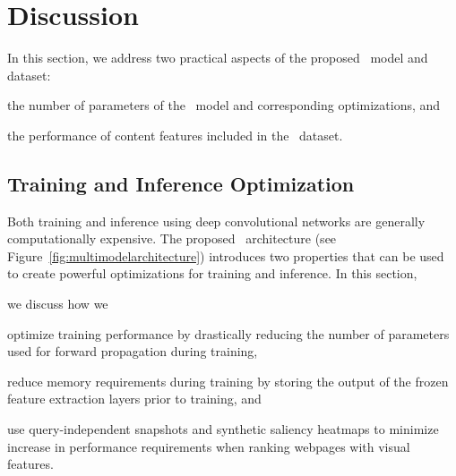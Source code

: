
\section{Discussion}
\label{sec:discussion}
In this section, we address two practical aspects of the proposed \modelname~model and dataset:
\begin{inparaenum}[(i)]
    \item the number of parameters of the \modelname~model and corresponding optimizations, and
    \item the performance of content features included in the \datasetname~dataset.
\end{inparaenum}


\subsection{Training and Inference Optimization} \label{sec:sectionoptimalization}
Both training and inference using deep convolutional networks are generally computationally expensive.
The proposed \modelname~architecture (see Figure~\ref{fig:multimodelarchitecture}) introduces two properties that can be used to create powerful optimizations for training and inference.
In this section, 

we discuss how we
\begin{inparaenum}[(i)]
    \item optimize training performance by drastically reducing the number of parameters used for forward propagation during training, 
    \item reduce memory requirements during training by storing the output of the frozen feature extraction layers prior to training, and
    \item use query-independent snapshots and synthetic saliency heatmaps to minimize increase in performance requirements when ranking webpages with visual features.
\end{inparaenum}
\fi

